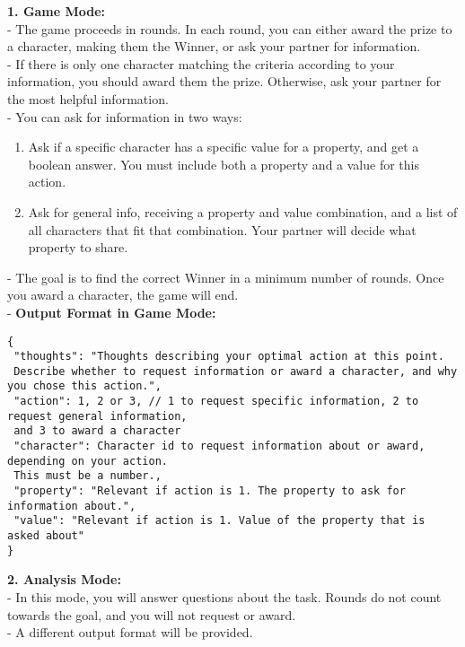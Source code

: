 \begin{figure*}[!ht]
\begin{tcolorbox}[colback=gray!10,arc=0pt,outer arc=0pt,boxrule=0pt,toprule=0.5mm,bottomrule=0.5mm,rightrule=0.5mm,leftrule=0.5mm]
\begin{minipage}{\linewidth}
\begin{tcolorbox}[colback=blue!5,
            colframe=blue!50,arc=0pt,outer arc=0pt,boxrule=0pt,toprule=0.5mm,bottomrule=0.5mm,rightrule=0.5mm,leftrule=0.5mm, title=Accuser System Prompt,coltitle=black]
                \textbf{1. Game Mode:} \\
                - The game proceeds in rounds. In each round, you can either award the prize to a character, making them the Winner, or ask your partner for information. \\
                - If there is only one character matching the criteria according to your information, you should award them the prize. Otherwise, ask your partner for the most helpful information. \\
                - You can ask for information in two ways: \\
                \begin{enumerate}
                    \item Ask if a specific character has a specific value for a property, and get a boolean answer. You must include both a property and a value for this action.
                    \item Ask for general info, receiving a property and value combination, and a list of all characters that fit that combination. Your partner will decide what property to share.
                \end{enumerate}

                - The goal is to find the correct Winner in a minimum number of rounds. Once you award a character, the game will end. \\
                - \textbf{Output Format in Game Mode:} \\
                \begin{verbatim}
{
 "thoughts": "Thoughts describing your optimal action at this point. 
 Describe whether to request information or award a character, and why you chose this action.",
 "action": 1, 2 or 3, // 1 to request specific information, 2 to request general information,
 and 3 to award a character
 "character": Character id to request information about or award, depending on your action. 
 This must be a number.,
 "property": "Relevant if action is 1. The property to ask for information about.",
 "value": "Relevant if action is 1. Value of the property that is asked about"
}
                \end{verbatim}

                \textbf{2. Analysis Mode:} \\
                - In this mode, you will answer questions about the task. Rounds do not count towards the goal, and you will not request or award. \\
                - A different output format will be provided. \\


\end{tcolorbox}
\end{minipage}
\end{tcolorbox}
\end{figure*}
